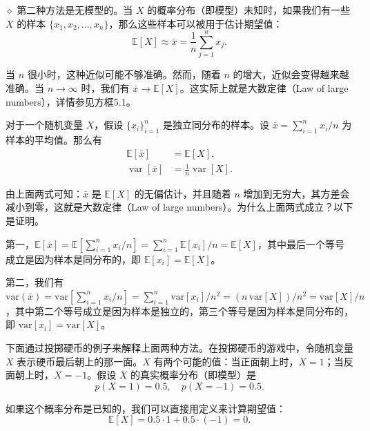 $\diamond$ 第二种方法是无模型的。当 $X$ 的概率分布（即模型）未知时，如果我们有一些 $X$ 的样本 $\{x_{1}, x_{2}, \ldots, x_{n}\}$，那么这些样本可以被用于估计期望值：
\begin{equation}
\mathbb{E}[X] \approx \bar{x} = \frac{1}{n} \sum_{j=1}^{n} x_{j}.
\end{equation}

当 $n$ 很小时，这种近似可能不够准确。然而，随着 $n$ 的增大，近似会变得越来越准确。当 $n \to \infty$ 时，我们有 $\bar{x} \to \mathbb{E}[X]$。这实际上就是大数定律（Law of large numbers），详情参见方框5.1。

\begin{derivation}[方框5.1：大数定律]
对于一个随机变量 $X$，假设 $\{x_{i}\}_{i=1}^{n}$ 是独立同分布的样本。设 $\bar{x} = \sum_{i=1}^{n} x_{i} / n$ 为样本的平均值。那么有
\begin{align}
\mathbb{E}[\bar{x}] &= \mathbb{E}[X], \\
\operatorname{var}[\bar{x}] &= \frac{1}{n} \operatorname{var}[X].
\end{align}

由上面两式可知：$\bar{x}$ 是 $\mathbb{E}[X]$ 的无偏估计，并且随着 $n$ 增加到无穷大，其方差会减小到零，这就是大数定律（Law of large numbers）。为什么上面两式成立？以下是证明。

第一，$\mathbb{E}[\bar{x}] = \mathbb{E}\left[\sum_{i=1}^{n} x_i / n\right] = \sum_{i=1}^{n} \mathbb{E}[x_i] / n = \mathbb{E}[X]$，其中最后一个等号成立是因为样本是同分布的，即 $\mathbb{E}[x_i] = \mathbb{E}[X]$。

第二，我们有 $\mathrm{var}(\bar{x}) = \mathrm{var}\left[\sum_{i=1}^{n} x_i / n\right] = \sum_{i=1}^{n} \mathrm{var}[x_i] / n^2 = (n\,\mathrm{var}[X]) / n^2 = \mathrm{var}[X] / n$，其中第二个等号成立是因为样本是独立的，第三个等号是因为样本是同分布的，即 $\mathrm{var}[x_i] = \mathrm{var}[X]$。
\end{derivation}

下面通过投掷硬币的例子来解释上面两种方法。在投掷硬币的游戏中，令随机变量 $X$ 表示硬币最后朝上的那一面。$X$ 有两个可能的值：当正面朝上时，$X = 1$；当反面朝上时，$X = -1$。假设 $X$ 的真实概率分布（即模型）是
\begin{equation}
p(X = 1) = 0.5, \quad p(X = -1) = 0.5.
\end{equation}

如果这个概率分布是已知的，我们可以直接用定义来计算期望值：
\begin{equation}
\mathbb{E}[X] = 0.5 \cdot 1 + 0.5 \cdot (-1) = 0.
\end{equation}

